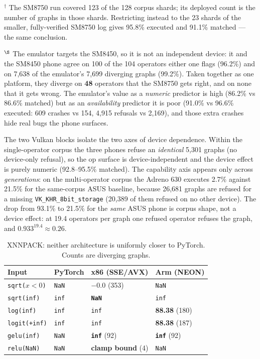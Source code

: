 \begin{table}[t]
\vspace{2pt}
\raggedright\footnotesize
$^{\dagger}$ The SM8750 run covered 123 of the 128 corpus shards; its deployed count is the number of
graphs in those shards. Restricting instead to the 23 shards of the smaller, fully-verified SM8750 log
gives 95.8\% executed and 91.1\% matched --- the same conclusion.

$^{\S}$ The emulator targets the SM8450, so it is not an independent device: it and the SM8450 phone
agree on 100 of the 104 operators either one flags (96.2\%) and on 7{,}638 of the emulator's 7{,}699
diverging graphs (99.2\%). Taken together as one platform, they diverge on \textbf{48} operators that
the SM8750 gets right, and on none that it gets wrong. The emulator's value as a \emph{numeric}
predictor is high (86.2\% vs 86.6\% matched) but as an \emph{availability} predictor it is poor
(91.0\% vs 96.6\% executed: 609 crashes vs 154, 4{,}915 refusals vs 2{,}169), and those extra
crashes hide real bugs the phone surfaces.

The two Vulkan blocks isolate the two axes of device dependence. Within the single-operator corpus the
three phones refuse an \emph{identical} 5{,}301 graphs (no device-only refusal), so the op surface is
device-independent and the device effect is purely numeric (92.8--95.5\% matched). The capability axis
appears only across \emph{generations}: on the multi-operator corpus the Adreno 630 executes 2.7\%
against 21.5\% for the same-corpus ASUS baseline, because 26{,}681 graphs are refused for a missing
\verb|VK_KHR_8bit_storage| (20{,}389 of them refused on no other device). The drop from 93.1\% to
21.5\% for the \emph{same} ASUS phone is corpus shape, not a device effect: at 19.4 operators per
graph one refused operator refuses the graph, and $0.933^{19.4} \approx 0.26$.

\begin{table}[t]
\centering
\small
\caption{XNNPACK: neither architecture is uniformly closer to PyTorch. Counts are diverging graphs.}
\label{tab:xnnpack-arch}
\begin{tabular}{llll}
\toprule
Input & PyTorch & x86 (SSE/AVX) & Arm (NEON) \\
\midrule
\texttt{sqrt($x<0$)}   & \texttt{NaN} & \textbf{$-0.0$} (353) & \texttt{NaN} \\
\texttt{sqrt(inf)}     & \texttt{inf} & \textbf{\texttt{NaN}} & \texttt{inf} \\
\texttt{log(inf)}      & \texttt{inf} & \texttt{inf}          & \textbf{88.38} (180) \\
\texttt{logit(+inf)}   & \texttt{inf} & \texttt{inf}          & \textbf{88.38} (187) \\
\texttt{gelu(inf)}     & \texttt{NaN} & \textbf{\texttt{inf}} (92) & \textbf{\texttt{inf}} (92) \\
\texttt{relu(NaN)}     & \texttt{NaN} & \textbf{clamp bound} (4) & \texttt{NaN} \\
\bottomrule
\end{tabular}
\end{table}


\end{table}

